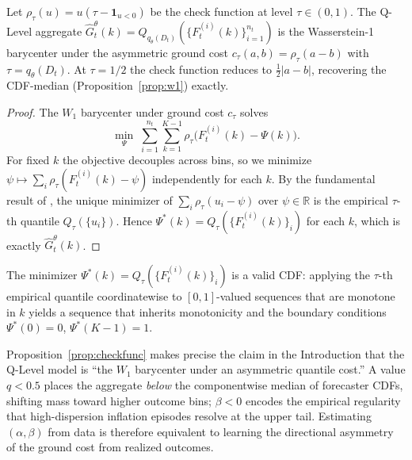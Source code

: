 \begin{proposition}
\label{prop:checkfunc}
Let $\rho_\tau(u) = u(\tau - \mathbf{1}_{u < 0})$ be the check function at level $\tau \in (0,1)$.
The Q-Level aggregate $\hat{G}_t^\theta(k) = Q_{q_\theta(D_t)}(\{F_t^{(i)}(k)\}_{i=1}^{n_t})$
is the Wasserstein-1 barycenter under the asymmetric ground cost
$c_\tau(a,b) = \rho_\tau(a - b)$ with $\tau = q_\theta(D_t)$.
At $\tau = 1/2$ the check function reduces to $\tfrac{1}{2}|a-b|$, recovering the
CDF-median (Proposition~\ref{prop:w1}) exactly.
\end{proposition}

\begin{proof}
The $W_1$ barycenter under ground cost $c_\tau$ solves
\[
  \min_{\Psi} \;\sum_{i=1}^{n_t}\sum_{k=1}^{K-1} \rho_\tau\!\bigl(F_t^{(i)}(k) - \Psi(k)\bigr).
\]
For fixed $k$ the objective decouples across bins, so we minimize
$\psi \mapsto \sum_i \rho_\tau(F_t^{(i)}(k) - \psi)$ independently for each $k$.
By the fundamental result of \cite{koenker78}, the unique minimizer of
$\sum_i \rho_\tau(u_i - \psi)$ over $\psi \in \mathbb{R}$ is the empirical
$\tau$-th quantile $Q_\tau(\{u_i\})$.
Hence $\Psi^*(k) = Q_\tau(\{F_t^{(i)}(k)\}_i)$ for each $k$, which is exactly
$\hat{G}_t^\theta(k)$.
\end{proof}

\begin{remark}
The minimizer $\Psi^*(k) = Q_\tau(\{F_t^{(i)}(k)\}_i)$ is a valid CDF: applying the
$\tau$-th empirical quantile coordinatewise to $[0,1]$-valued sequences that are monotone
in $k$ yields a sequence that inherits monotonicity and the boundary conditions
$\Psi^*(0) = 0$, $\Psi^*(K-1) = 1$.
\end{remark}

\begin{remark}
Proposition~\ref{prop:checkfunc} makes precise the claim in the Introduction that
the Q-Level model is ``the $W_1$ barycenter under an asymmetric quantile cost.''
A value $q < 0.5$ places the aggregate \emph{below} the componentwise median of
forecaster CDFs, shifting mass toward higher outcome bins; $\beta < 0$ encodes
the empirical regularity that high-dispersion inflation episodes resolve at the upper tail.
Estimating $(\alpha, \beta)$ from data is therefore equivalent to learning the directional
asymmetry of the ground cost from realized outcomes.
\end{remark}

